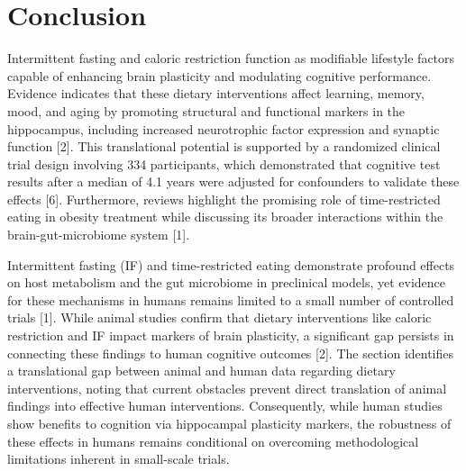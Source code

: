 \documentclass[11pt]{article}
\begin{document}
\section{Conclusion}
Intermittent fasting and caloric restriction function as modifiable lifestyle factors capable of enhancing brain plasticity and modulating cognitive performance. Evidence indicates that these dietary interventions affect learning, memory, mood, and aging by promoting structural and functional markers in the hippocampus, including increased neurotrophic factor expression and synaptic function [2]. This translational potential is supported by a randomized clinical trial design involving 334 participants, which demonstrated that cognitive test results after a median of 4.1 years were adjusted for confounders to validate these effects [6]. Furthermore, reviews highlight the promising role of time-restricted eating in obesity treatment while discussing its broader interactions within the brain-gut-microbiome system [1].

Intermittent fasting (IF) and time-restricted eating demonstrate profound effects on host metabolism and the gut microbiome in preclinical models, yet evidence for these mechanisms in humans remains limited to a small number of controlled trials [1]. While animal studies confirm that dietary interventions like caloric restriction and IF impact markers of brain plasticity, a significant gap persists in connecting these findings to human cognitive outcomes [2]. The section identifies a translational gap between animal and human data regarding dietary interventions, noting that current obstacles prevent direct translation of animal findings into effective human interventions. Consequently, while human studies show benefits to cognition via hippocampal plasticity markers, the robustness of these effects in humans remains conditional on overcoming methodological limitations inherent in small-scale trials.
\end{document}
